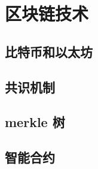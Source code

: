 
\chapter{区块链技术}

\section{比特币和以太坊}
\section{共识机制}
\section{merkle 树}
\section{智能合约}
\pkuthssffaq %


